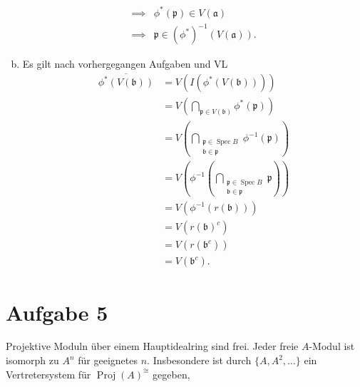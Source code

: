\documentclass{article}
\newcommand{\spec}{\operatorname{Spec}}
\begin{document}
\begin{enumerate}[(a)]
\begin{align*}
        \implies&\phi^*(\mathfrak{p}) \in V(\mathfrak{a})\\
        \implies&\mathfrak{p} \in (\phi^*)^{-1}(V(\mathfrak{a})).
    \end{align*}
    \item Es gilt nach vorhergegangen Aufgaben und VL
    \begin{align*}
        \overline{\phi^*(V(\mathfrak{b}))} &= V(I(\phi^*(V(\mathfrak{b}))))\\
        &= V\left( \bigcap_{\mathfrak{p} \in V(\mathfrak{b})} \phi^*(\mathfrak{p})\right)\\
        &= V\left( \bigcap_{\substack{\mathfrak{p} \in \spec B\\\mathfrak{b}\in \mathfrak{p}}}\phi^{-1}(\mathfrak{p})\right)\\
        &= V\left(\phi^{-1}\left(\bigcap_{\substack{\mathfrak{p}\in\spec B\\\mathfrak{b}\in\mathfrak{p}}}\mathfrak{p}\right)\right)\\
        &= V\left(\phi^{-1}(r(\mathfrak{b}))\right)\\
        &= V\left( r(\mathfrak{b})^c \right)\\
        &= V\left( r(\mathfrak{b}^c) \right)\\
        &= V\left( \mathfrak{b}^c \right).
    \end{align*}
\end{enumerate}
\section*{Aufgabe 5}
Projektive Moduln über einem Hauptidealring sind frei.
Jeder freie $A$-Modul ist isomorph zu $A^n$ für geeignetes $n$.
Insbesondere ist durch $\{A, A^2, \dots\}$ ein Vertretersystem für $\operatorname{Proj}(A)^{\cong}$ gegeben,
\end{document}
